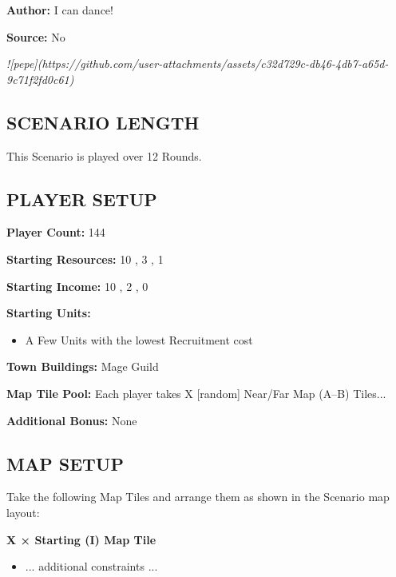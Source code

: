 
\begin{multicols*}{2}

\textbf{Author:} I can dance!

\textbf{Source:} No

\textit{![pepe](https://github.com/user-attachments/assets/c32d729c-db46-4db7-a65d-9c71f2fd0c61)}

\subsection*{\MakeUppercase{Scenario Length}}

This Scenario is played over 12 Rounds.

\subsection*{\MakeUppercase{Player Setup}}

\textbf{Player Count:} 144

\textbf{Starting Resources:} 10 , 3 , 1 

\textbf{Starting Income:} 10 , 2 , 0 

\textbf{Starting Units:}
\begin{itemize}
  \item A Few  Units with the lowest Recruitment cost
\end{itemize}

\textbf{Town Buildings:} Mage Guild

\textbf{Map Tile Pool:} Each player takes X [random] Near/Far Map (A--B) Tiles...

\textbf{Additional Bonus:} None

\subsection*{\MakeUppercase{Map Setup}}

Take the following Map Tiles and arrange them as shown in the Scenario map layout:

\textbf{X × Starting (I) Map Tile}
\begin{itemize}
    \item ... additional constraints ...
\end{itemize}


\end{multicols*}
